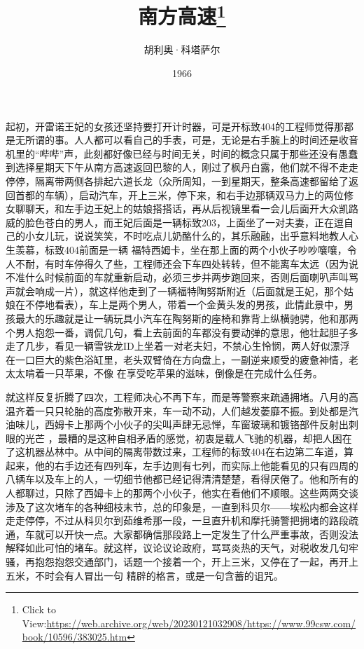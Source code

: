 \documentclass{article}
\title{南方高速\footnote{Click to View:\url{https://web.archive.org/web/20230121032908/https://www.99csw.com/book/10596/383025.htm}}}
\author{胡利奥·科塔萨尔}
\date{1966}
\begin{document}

\maketitle


\Large

﻿起初，开雷诺王妃的女孩还坚持要打开计时器，可是开标致404的工程师觉得那都是无所谓的事。人人都可以看自己的手表，可是，无论是右手腕上的时间还是收音机里的“哔哔”声，此刻都好像已经与时间无关，时间的概念只属于那些还没有愚蠢到选择星期天下午从南方高速返回巴黎的人，刚过了枫丹白露，他们就不得不走走停停，隔离带两侧各排起六道长龙（众所周知，一到星期天，整条高速都留给了返回首都的车辆），启动汽车，开上三米，停下来，和右手边那辆双马力上的两位修女聊聊天，和左手边王妃上的姑娘搭搭话，再从后视镜里看一会儿后面开大众凯路威的脸色苍白的男人，而王妃后面是一辆标致203，上面坐了一对夫妻，正在逗自己的小女儿玩，说说笑笑，不时吃点儿奶酪什么的，其乐融融，出乎意料地教人心生羡慕，标致404前面是一辆
\newpage
福特西姆卡，坐在那上面的两个小伙子吵吵嚷嚷，令人不耐，有时车停得久了些，工程师还会下车四处转转，但不能离车太远（因为说不准什么时候前面的车就重新启动，必须三步并两步跑回来，否则后面喇叭声叫骂声就会响成一片），就这样他走到了一辆福特陶努斯附近（后面就是王妃，那个姑娘在不停地看表），车上是两个男人，带着一个金黄头发的男孩，此情此景中，男孩最大的乐趣就是让一辆玩具小汽车在陶努斯的座椅和靠背上纵横驰骋，他和那两个男人抱怨一番，调侃几句，看上去前面的车都没有要动弹的意思，他壮起胆子多走了几步，看见一辆雪铁龙ID上坐着一对老夫妇，不禁心生怜悯，两人好似漂浮在一口巨大的紫色浴缸里，老头双臂倚在方向盘上，一副逆来顺受的疲惫神情，老太太啃着一只苹果，不像
在享受吃苹果的滋味，倒像是在完成什么任务。 

就这样反复折腾了四次，工程师决心不再下车，而是等警察来疏通拥堵。八月的高温齐着一只只轮胎的高度弥散开来，车一动不动，人们越发萎靡不振。到处都是汽油味儿，西姆卡上那两个小伙子的尖叫声肆无忌惮，车窗玻璃和镀铬部件反射出刺眼的光芒
\newpage
，最糟的是这种自相矛盾的感觉，初衷是载人飞驰的机器，却把人困在了这机器丛林中。从中间的隔离带数过来，工程师的标致404在右边第二车道，算起来，他的右手边还有四列车，左手边则有七列，而实际上他能看见的只有四周的八辆车以及车上的人，一切细节他都已经记得清清楚楚，看得厌倦了。他和所有的人都聊过，只除了西姆卡上的那两个小伙子，他实在看他们不顺眼。这些两两交谈涉及了这次堵车的各种细枝末节，总的印象是，一直到科贝尔——埃松内都会这样走走停停，不过从科贝尔到茹维希那一段，一旦直升机和摩托骑警把拥堵的路段疏通，车就可以开快一点。大家都确信那段路上一定发生了什么严重事故，否则没法解释如此可怕的堵车。就这样，议论议论政府，骂骂炎热的天气，对税收发几句牢骚，再抱怨抱怨交通部门，话题一个接着一个，开上三米，又停在了一起，再开上五米，不时会有人冒出一句
精辟的格言，或是一句含蓄的诅咒。 
\end{document}
